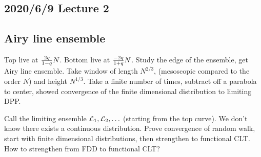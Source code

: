 





\subsection*{2020/6/9 Lecture 2}
\subsection{Airy line ensemble}




Top live at $\frac{2q}{1-q}N$.
Bottom live at $\frac{-2q}{1+q}N$.
Study the edge of the ensemble, get Airy line ensemble. Take window of length $N^{2/3}$, (mesoscopic compared to the order $N$) and height $N^{1/3}$. Take a finite number of times, subtract off a parabola to center, showed convergence of the finite dimensional distribution to limiting DPP.

Call the limiting ensemble $\mathcal{L}_1,\mathcal{L}_2,\ldots$ (starting from the top curve). We don't know there exists a continuous distribution. Prove convergence of random walk, start with finite dimensional distributions, then strengthen to functional CLT. How to strengthen from FDD to functional CLT?

